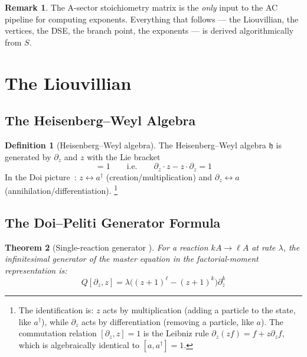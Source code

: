 \documentclass[11pt,a4paper]{article}
\newtheorem{theorem}{Theorem}[section]
\theoremstyle{definition}
\newtheorem{definition}[theorem]{Definition}
\newtheorem*{remark}{Remark}
\begin{document}
\begin{remark}
The A-sector stoichiometry matrix is the \emph{only} input to the
AC pipeline for computing exponents.
Everything that follows --- the Liouvillian, the vertices, the DSE, the
branch point, the exponents --- is derived algorithmically from $S$.
\end{remark}

\section{The Liouvillian}
\label{sec:liouvillian}

\subsection{The Heisenberg--Weyl Algebra}

\begin{definition}[Heisenberg--Weyl algebra]
The Heisenberg--Weyl algebra $\mathfrak{h}$ is generated by $\partial_z$ and $z$
with the Lie bracket
\begin{equation}
[\partial_z, z] = 1 \qquad \text{i.e.} \qquad \partial_z \cdot z - z \cdot \partial_z = 1
\end{equation}
In the Doi picture~\cite{doi1976}: $z \leftrightarrow a^\dagger$ (creation/multiplication)
and $\partial_z \leftrightarrow a$ (annihilation/differentiation).%
\footnote{The identification is: $z$ acts by multiplication
(adding a particle to the state, like $a^\dagger$), while $\partial_z$
acts by differentiation (removing a particle, like $a$). The commutation
relation $[\partial_z, z] = 1$ is the Leibniz rule $\partial_z(z f) = f + z\partial_z f$,
which is algebraically identical to $[a, a^\dagger] = 1$.}
\end{definition}

\subsection{The Doi--Peliti Generator Formula}

\begin{theorem}[Single-reaction generator {\cite{doi1976,peliti1985,amarteifio2019}}]
\label{thm:generator}
For a reaction $kA \to \ell A$ at rate $\lambda$, the infinitesimal generator
of the master equation in the factorial-moment representation is:
\begin{equation}
\boxed{Q[\partial_z, z] = \lambda \bigl((z+1)^\ell - (z+1)^k\bigr) \partial_z^k}
\label{eq:generator}
\end{equation}
\end{theorem}
\end{document}
